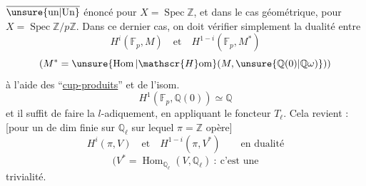 $\overline{\text{\unsure{un|Un}}}$ énoncé pour $X=\operatorname{Spec}\mathbb{Z}$, et dans le cas géométrique, pour $X=\operatorname{Spec}\mathbb{Z}/p\mathbb{Z}$. Dans ce dernier cas, on doit vérifier simplement la dualité entre
\[
H^i(\mathbb{F}_p,M)\quad\text{et}\quad H^{1-i}(\mathbb{F}_p,M^*)
\]
\[
(M^*=\unsure{\operatorname{Hom}|\mathscr{H}\mathrm{om}}(M,\unsure{\mathbb{Q}(0)|\mathbb{Q}\omega)}))
\]
à l'aide des ``\uline{cup-produits}'' et de l'isom.
\[
H^1(\mathbb{F}_p,\mathbb{Q}(0))\simeq\mathbb{Q}
\]
et il suffit de faire la  $l$-adiquement, en appliquant le foncteur $T_\ell$. Cela revient :   [pour un  de dim finie sur $\mathbb{Q}_\ell$ sur lequel $\pi=\mathbb{Z}$ opère]
\[
H^i(\pi,V)\quad\text{et}\quad H^{1-i}(\pi,V^*)\qquad\text{en dualité}
\]
\[
(V^*=\operatorname{Hom}_{\mathbb{Q}_\ell}(V,\mathbb{Q}_\ell)\ :\ \text{c'est une}
\]
trivialité.

